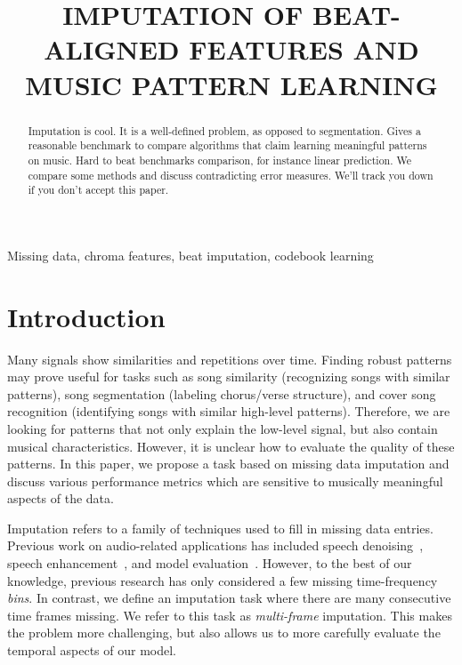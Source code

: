 \documentclass{article}
\title{IMPUTATION OF BEAT-ALIGNED FEATURES AND MUSIC PATTERN LEARNING}
\begin{document}
\ninept
%
\maketitle
%
\begin{abstract}
Imputation is cool. It is a well-defined problem, as opposed to segmentation.
Gives a reasonable benchmark to compare algorithms that claim learning meaningful
patterns on music. Hard to beat benchmarks comparison, for instance linear
prediction. We compare some methods and discuss contradicting error measures. 
We'll track you down if you don't accept this paper.
\end{abstract}
%
\begin{keywords}
Missing data, chroma features, beat imputation, codebook learning
\end{keywords}
%
\section{Introduction}
\label{sec:intro}
Many signals show similarities and repetitions over time.  
Finding robust patterns may prove useful for tasks such as song
similarity (recognizing songs with similar patterns), song
segmentation (labeling chorus/verse structure), and cover song
recognition (identifying songs with similar high-level patterns).
Therefore, we are looking for patterns that not only explain the
low-level signal, but also contain musical characteristics.  However,
it is unclear how to evaluate the quality of these patterns.  In this
paper, we propose a task based on missing data imputation and discuss
various performance metrics which are sensitive to musically
meaningful aspects of the data.  

Imputation refers to a family of techniques used to fill in missing
data entries.  Previous work on audio-related applications has
included speech denoising~\cite{Raj1998}, speech
enhancement~\cite{Sanneck1996}, and model
evaluation~\cite{Smaragdis2009,Hoffman2010}.  However, to the best of
our knowledge, previous research has only considered a few missing
time-frequency \emph{bins}.  In contrast, we define an imputation task
where there are many consecutive time frames missing.  We refer to
this task as \emph{multi-frame} imputation.  This makes the problem
more challenging, but also allows us to more carefully evaluate the
temporal aspects of our model.  %
\end{document}
